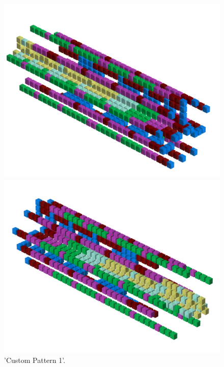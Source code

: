 \begin{figure}[H]
    \centering
    \begin{adjustbox}{width=12cm,center}
      \includegraphics[width=12cm]{src/patterns/pattern9-45.png}%
    \end{adjustbox}
    \begin{adjustbox}{width=12cm,margin=0cm -4cm}
      \includegraphics[width=12cm]{src/patterns/pattern9-225.png}%
    \end{adjustbox}
\caption{'Custom Pattern 1'.}
\end{figure}
\clearpage

